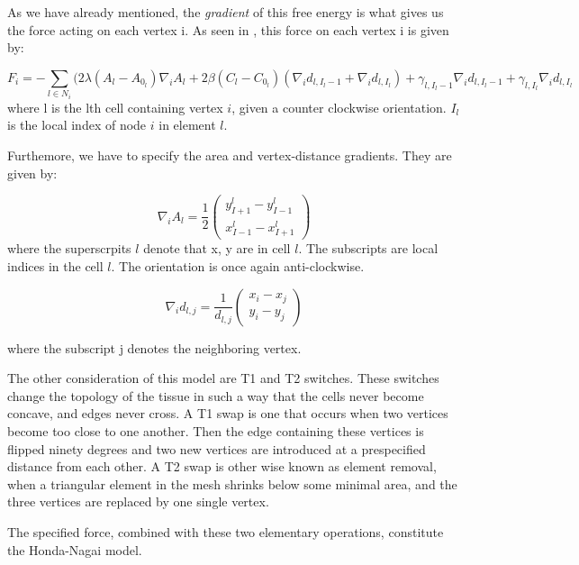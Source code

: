 As we have already mentioned, the \emph{gradient} of this free energy is what gives us the force acting on each vertex i.  As seen in \cite{ChasteMain}, this force on each vertex i is given by:

\begin{equation}
F_i = -\displaystyle\sum_{l\in N_i}(2\lambda(A_l - A_{0_l})\nabla_iA_l + 2\beta(C_l - C_{0_l})(\nabla_i d_{l, I_l-1}+\nabla_i d_{l, I_l}) + \gamma_{l, I_l-1}\nabla_i d_{l, I_l-1} + \gamma_{l, I_l}\nabla_i d_{l, I_l}
\end{equation} 
where l is the lth cell containing vertex $i$, given a counter clockwise orientation. $I_l$ is the local index of node $i$ in element $l$.

Furthemore, we have to specify the area and vertex-distance gradients. They are given by:

\begin{equation}
\nabla_i A_l = \frac12
\left(
\begin{array}{c}
y^l_{I+1} - y^l_{I-1}\\
x^l_{I-1} - x^l_{I+1}
\end{array}
\right)
\end{equation}
 where the superscrpits $l$ denote that x, y are in cell $l$. The subscripts are local indices in the cell $l$. The orientation is once again anti-clockwise.

\begin{equation}
\nabla_id_{l, j} = \frac1{d_{l, j}}
\left(
\begin{array}{c}
x_i - x_j\\
y_i - y_j
\end{array}
\right)
\end{equation}

where the subscript j denotes the neighboring vertex.

The other consideration of this model are T1 and T2 switches. These switches change the topology of the tissue in such a way that the cells never become concave, and edges never cross. A T1 swap is one that occurs when two vertices become too close to one another. Then the edge containing these vertices is flipped ninety degrees and two new vertices are introduced at a prespecified distance from each other. A T2 swap is other wise known as element removal, when a triangular element in the mesh shrinks below some minimal area, and the three vertices are replaced by one single vertex. 

The specified force, combined with these two elementary operations, constitute the Honda-Nagai model.


